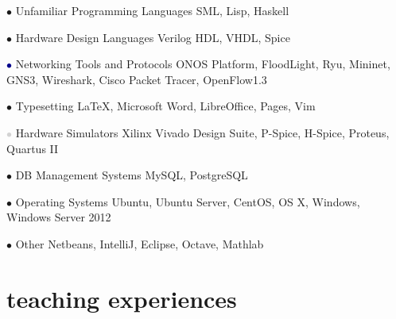 \documentclass[]{friggeri-cv} %
\begin{document}
\begin{entrylist}

\entry
{\textcolor{TextGreen}{$\bullet$}}
{Unfamiliar Programming Languages}
{}
{SML, Lisp, Haskell}


\entry
{\textcolor{TextOrange}{$\bullet$}}
{Hardware Design Languages}
{}
{Verilog HDL, VHDL, Spice}


\entry
{\textcolor{DarkBlue}{$\bullet$}}
{Networking Tools and Protocols}
{}
{ONOS Platform, FloodLight, Ryu, Mininet, GNS3, Wireshark, Cisco Packet Tracer, OpenFlow1.3}


\entry
{\textcolor{Ocean}{$\bullet$}}
{Typesetting}
{}
{\LaTeX, Microsoft Word, LibreOffice, Pages, Vim}


\entry
{\textcolor{LightGray}{$\bullet$}}
{Hardware Simulators}
{}
{Xilinx Vivado Design Suite, P-Spice, H-Spice, Proteus, Quartus II}


\entry
{\textcolor{TextYellow}{$\bullet$}}
{DB Management Systems}
{}
{MySQL, PostgreSQL}


\entry
{\textcolor{TextRed}{$\bullet$}}
{Operating Systems}
{}
{Ubuntu, Ubuntu Server, CentOS, OS X, Windows, Windows Server 2012}


\entry
{\textcolor{TextPink}{$\bullet$}}
{Other}
{}
{Netbeans, IntelliJ, Eclipse, Octave, Mathlab}


\end{entrylist}


\section{teaching experiences}
\end{document}
